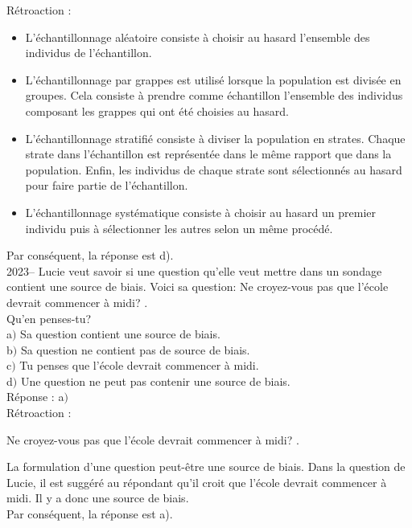\documentclass[letterpaper, 12pt]{article}
\begin{document}
R\'etroaction :\\
\begin{itemize}
 \item L'\'echantillonnage al\'eatoire consiste \`a choisir au hasard l'ensemble des individus de l'\'echantillon. \\
\item L'\'echantillonnage par grappes est utilis\'e lorsque la population est divis\'ee en groupes. Cela consiste \`a prendre comme \'echantillon l'ensemble des individus composant les grappes qui ont \'et\'e choisies au hasard. \\
\item L'\'echantillonnage stratifi\'e consiste \`a diviser la population en strates. Chaque strate dans l'\'echantillon est repr\'esent\'ee dans le m\^eme rapport que dans la population. Enfin, les individus de chaque strate sont s\'electionn\'es au hasard pour faire partie de l'\'echantillon. \\
\item L'\'echantillonnage syst\'ematique consiste \`a choisir au hasard un premier individu puis \`a s\'electionner les autres selon un m\^eme proc\'ed\'e. \\
\end{itemize}
Par cons\'equent, la r\'eponse est d).\\

2023-- Lucie veut savoir si une question qu'elle veut mettre dans un sondage contient une source de biais. Voici sa question: \og Ne croyez-vous pas que l'\'ecole devrait commencer \`a midi?  \fg.\\
Qu'en penses-tu? \\

a$)$ Sa question contient une source de biais.\\
b$)$ Sa question ne contient pas de source de biais.\\
c$)$ Tu penses que l'\'ecole devrait commencer \`a midi.\\
d$)$ Une question ne peut pas contenir une source de biais.\\

R\'eponse : a$)$\\

R\'etroaction :
\begin{center}
 \og Ne croyez-vous pas que l'\'ecole devrait commencer \`a midi?  \fg.
\end{center}
La formulation d'une question peut-\^etre une source de biais. Dans la question de Lucie, il est sugg\'er\'e au r\'epondant qu'il croit que l'\'ecole devrait commencer \`a midi. Il y a donc une source de biais. \\
Par cons\'equent, la r\'eponse est a).\\
\end{document}
